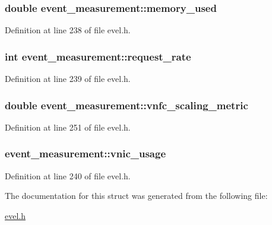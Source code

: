 \subsubsection[{memory\+\_\+used}]{\setlength{\rightskip}{0pt plus 5cm}double event\+\_\+measurement\+::memory\+\_\+used}\label{structevent__measurement_a81914f75438f34fd5acc85ad6204e800}


Definition at line 238 of file evel.\+h.

\hypertarget{structevent__measurement_ab0984600bb4a0701489fdde7d2b147e8}{}
\subsubsection[{request\+\_\+rate}]{\setlength{\rightskip}{0pt plus 5cm}int event\+\_\+measurement\+::request\+\_\+rate}\label{structevent__measurement_ab0984600bb4a0701489fdde7d2b147e8}


Definition at line 239 of file evel.\+h.

\hypertarget{structevent__measurement_a4ac08dcf75a2eea41953666645bc4f33}{}
\subsubsection[{vnfc\+\_\+scaling\+\_\+metric}]{\setlength{\rightskip}{0pt plus 5cm}double event\+\_\+measurement\+::vnfc\+\_\+scaling\+\_\+metric}\label{structevent__measurement_a4ac08dcf75a2eea41953666645bc4f33}


Definition at line 251 of file evel.\+h.

\hypertarget{structevent__measurement_a2fcf32022554986d2e7e31cf561abbc4}{}
\subsubsection[{vnic\+\_\+usage}]{ event\+\_\+measurement\+::vnic\+\_\+usage}\label{structevent__measurement_a2fcf32022554986d2e7e31cf561abbc4}


Definition at line 240 of file evel.\+h.



The documentation for this struct was generated from the following file\+:\begin{DoxyCompactItemize}
\item 
\hyperlink{evel_8h}{evel.\+h}\end{DoxyCompactItemize}

